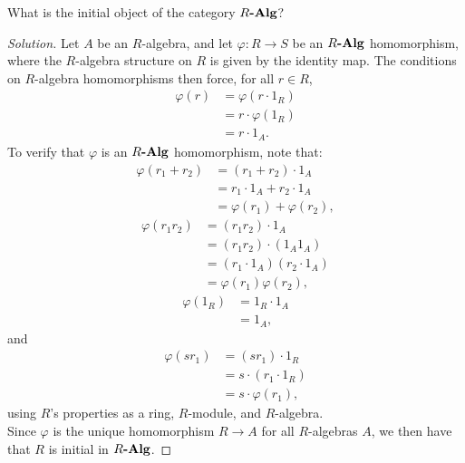 \documentclass[12pt]{article}
\newenvironment{problem}[2][Problem]{\begin{trivlist}
\item[\hskip \labelsep {\bfseries #1}\hskip \labelsep {\bfseries #2.}]}{\end{trivlist}}
\newcommand{\catname}[1]{\normalfont\textbf{#1}}
\newcommand{\Alg}[1]{#1\catname{-Alg}}
\newenvironment{solution}
  {\renewcommand\qedsymbol{$\blacksquare$}\begin{proof}[Solution]}
{\end{proof}}
\theoremstyle{remark}
\begin{document}
\begin{problem}{5.8}
  What is the initial object of the category $R\catname{-Alg}$?
\end{problem}
\begin{solution}
  Let $A$ be an $R$-algebra, and let $\varphi : R\to S$ be an $\Alg{R}$ 
  homomorphism, where the $R$-algebra structure on $R$ is given by
  the identity map.
  The conditions on $R$-algebra homomorphisms then force, for all $r\in R$,
  \begin{align*}
    \varphi(r) &= \varphi(r\cdot1_R) \\
    &= r\cdot\varphi(1_R) \\
    &= r\cdot1_A.
  \end{align*}
  To verify that $\varphi$ is an $\Alg{R}$ homomorphism, note that:
  \begin{align*}
    \varphi(r_1+r_2) &= (r_1+r_2)\cdot1_A \\
    &= r_1\cdot1_A + r_2\cdot1_A \\
    &= \varphi(r_1) + \varphi(r_2),
  \end{align*}
  \begin{align*}
    \varphi(r_1r_2) &= (r_1r_2)\cdot1_A \\
    &= (r_1r_2)\cdot(1_A1_A) \\
    &= (r_1\cdot1_A)(r_2\cdot1_A) \\
    &= \varphi(r_1)\varphi(r_2),
  \end{align*}
  \begin{align*}
    \varphi(1_R) &= 1_R\cdot 1_A\\
    &= 1_A,
  \end{align*}
  and
  \begin{align*}
    \varphi(sr_1) &= (sr_1)\cdot1_R \\
    &= s\cdot(r_1\cdot 1_R)\\
    &= s\cdot\varphi(r_1),
  \end{align*}
  using $R$'s properties as a ring, $R$-module, and $R$-algebra.\\
  \indent Since $\varphi$ is the unique homomorphism $R\to A$ for
  all $R$-algebras $A$, we then have that $R$ is initial in $\Alg{R}$.
\end{solution}

\newpage
\end{document}
